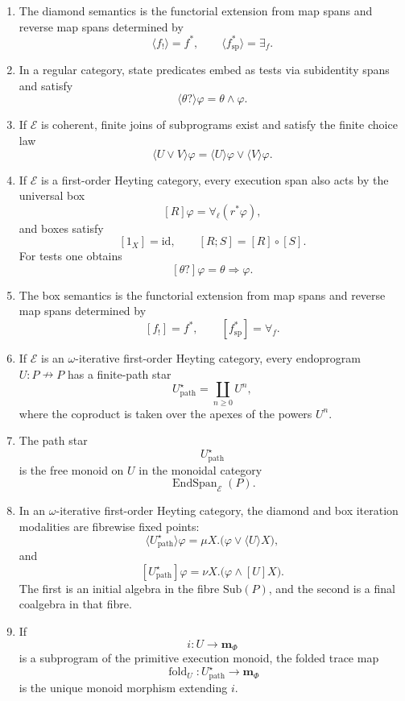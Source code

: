 \begin{theorem}
\begin{enumerate}
\item The diamond semantics is the functorial extension from map spans and reverse map spans determined by
\[
\langle f_!\rangle=f^\ast,
\qquad
\langle f^\ast_{\mathrm{sp}}\rangle=\exists_f.
\]

\item In a regular category, state predicates embed as tests via subidentity spans and satisfy
\[
\langle\theta?\rangle\varphi
=
\theta\wedge\varphi.
\]

\item If \(\mathcal E\) is coherent, finite joins of subprograms exist and satisfy the finite choice law
\[
\langle U\vee V\rangle\varphi
=
\langle U\rangle\varphi
\vee
\langle V\rangle\varphi.
\]

\item If \(\mathcal E\) is a first-order Heyting category, every execution span also acts by the universal box
\[
[R]\varphi
=
\forall_\ell(r^\ast\varphi),
\]
and boxes satisfy
\[
[1_X]=\mathrm{id},
\qquad
[R;S]=[R]\circ[S].
\]
For tests one obtains
\[
[\theta?]\varphi=\theta\Rightarrow\varphi.
\]

\item The box semantics is the functorial extension from map spans and reverse map spans determined by
\[
[f_!]=f^\ast,
\qquad
[f^\ast_{\mathrm{sp}}]=\forall_f.
\]

\item If \(\mathcal E\) is an \(\omega\)-iterative first-order Heyting category, every endoprogram \(U:P\nrightarrow P\) has a finite-path star
\[
U^\star_{\mathrm{path}}
=
\coprod_{n\ge0}U^n,
\]
where the coproduct is taken over the apexes of the powers \(U^n\).

\item The path star
\[
U^\star_{\mathrm{path}}
\]
is the free monoid on \(U\) in the monoidal category
\[
\operatorname{EndSpan}_{\mathcal E}(P).
\]

\item In an \(\omega\)-iterative first-order Heyting category, the diamond and box iteration modalities are fibrewise fixed points:
\[
\langle U^\star_{\mathrm{path}}\rangle\varphi
=
\mu X.\bigl(\varphi\vee\langle U\rangle X\bigr),
\]
and
\[
[U^\star_{\mathrm{path}}]\varphi
=
\nu X.\bigl(\varphi\wedge[U]X\bigr).
\]
The first is an initial algebra in the fibre \(\mathrm{Sub}(P)\), and the second is a final coalgebra in that fibre.

\item If
\[
i:U\to\mathbf m_\Phi
\]
is a subprogram of the primitive execution monoid, the folded trace map
\[
\operatorname{fold}_U:
U^\star_{\mathrm{path}}\to\mathbf m_\Phi
\]
is the unique monoid morphism extending \(i\).
\end{enumerate}
\end{theorem}

